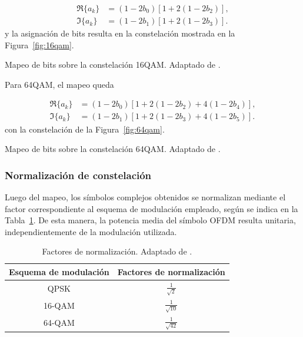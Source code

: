 \begin{align}
\Re\{a_k\} &= (1 - 2 b_0)\left[1 + 2(1 - 2 b_2)\right], \\
\Im\{a_k\} &= (1 - 2 b_1)\left[1 + 2(1 - 2 b_3)\right].
\end{align}
y la asignación de bits resulta en la constelación mostrada en la Figura~\ref{fig:16qam}.

{Mapeo de bits sobre la constelación 16QAM.}
{Adaptado de \cite{isdbt}.}
{\label{fig:16qam}}

Para 64QAM, el mapeo queda

\begin{align}
\Re\{a_k\} &= (1 - 2 b_0)\left[1 + 2(1 - 2 b_2) + 4(1 - 2 b_4)\right], \\
\Im\{a_k\} &= (1 - 2 b_1)\left[1 + 2(1 - 2 b_3) + 4(1 - 2 b_5)\right].
\end{align}
con la constelación de la Figura~\ref{fig:64qam}.

{Mapeo de bits sobre la constelación 64QAM.}
{Adaptado de \cite{isdbt}.}
{\label{fig:64qam}}

\subsubsection{Normalización de constelación}
Luego del mapeo, los símbolos complejos obtenidos se normalizan mediante el factor correspondiente al esquema de modulación empleado, según se indica en la Tabla~\ref{tab:normalizacion}. De esta manera, la potencia media del símbolo OFDM resulta unitaria, independientemente de la modulación utilizada.
{
\renewcommand{\arraystretch}{1.3}
\begin{table}[H]
    \centering
    \caption[{Factores de normalización.}]{Factores de normalización. Adaptado de \cite{abnt}.}
    \label{tab:normalizacion}

    \begin{tabular}{|c | c|}
        \hline
        \textbf{Esquema de modulación} & \textbf{Factores de normalización} \\
        \hline
        QPSK & $\frac{1}{\sqrt{2}}$ \rule[-2.2ex]{0pt}{3.2ex}\\
        \hline
        16-QAM & $\frac{1}{\sqrt{10}}$ \rule[-2.2ex]{0pt}{3.2ex}\\
        \hline
        64-QAM & $\frac{1}{\sqrt{42}}$ \rule[-2.2ex]{0pt}{3.2ex}\\
        \hline
    \end{tabular}
\end{table}
}

